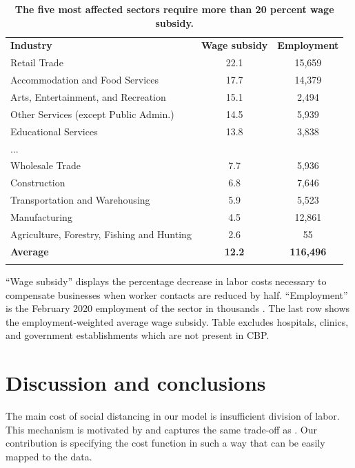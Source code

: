 \begin{table}[!ht]
\caption{
{\bf The five most affected sectors require more than 20 percent wage subsidy.}}
\begin{tabular}{|l|c|c|}
\hline
{\bf Industry} & {\bf Wage subsidy} & {\bf Employment} 
\\ \thickhline
Retail Trade	&22.1	&15,659\\
Accommodation and Food Services	&17.7	&14,379\\
Arts, Entertainment, and Recreation	&15.1	&2,494\\
Other Services (except Public Admin.)	&14.5	&5,939\\
Educational Services	&13.8	&3,838\\
...&&\\
Wholesale Trade	&7.7	&5,936\\
Construction	&6.8	&7,646\\
Transportation and Warehousing	&5.9	&5,523\\
Manufacturing	&4.5	&12,861\\
Agriculture, Forestry, Fishing and Hunting	&2.6	&55\\
\hline
{\bf Average} & {\bf 12.2} & {\bf 116,496}\\
 \thickhline

\hline
\end{tabular}
\begin{flushleft} ``Wage subsidy'' displays the percentage decrease in labor costs necessary to compensate businesses when worker contacts are reduced by half. ``Employment'' is the February 2020 employment of the sector in thousands \cite{CES}. The last row shows the employment-weighted average wage subsidy. Table excludes hospitals, clinics, and government establishments which are not present in CBP.
\end{flushleft}
\label{table3}
\end{table}


\section*{Discussion and conclusions}
The main cost of social distancing in our model is insufficient division of labor. This mechanism is motivated by \cite{Smith1778-qq} and captures the same trade-off as \cite{Becker1992-ac}. Our contribution is specifying the cost function in such a way that can be easily mapped to the data.

